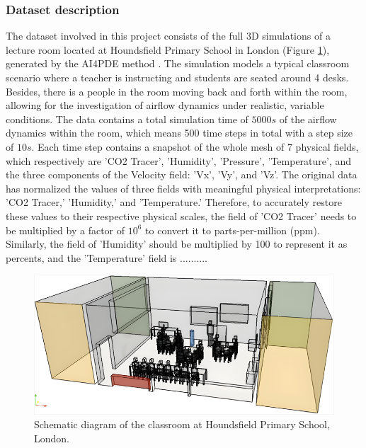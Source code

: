 \documentclass[final-report]{article-template}
\begin{document}
\subsubsection{Dataset description}
The dataset involved in this project consists of the full 3D simulations of a lecture room located at Houndsfield Primary School in London (Figure \ref{fig:classroom_schema}), generated by the AI4PDE method \cite{chen2024using}. The simulation models a typical classroom scenario where a teacher is instructing and students are seated around 4 desks. Besides, there is a people in the room moving back and forth within the room, allowing for the investigation of airflow dynamics under realistic, variable conditions. The data contains a total simulation time of $5000s$ of the airflow dynamics within the room, which means 500 time steps in total with a step size of $10s$. Each time step contains a snapshot of the whole mesh of 7 physical fields, which respectively are 'CO2 Tracer', 'Humidity', 'Pressure', 'Temperature', and the three components of the Velocity field: 'Vx', 'Vy', and 'Vz'. The original data has normalized the values of three fields with meaningful physical interpretations: 'CO2 Tracer,' 'Humidity,' and 'Temperature.' Therefore, to accurately restore these values to their respective physical scales, the field of 'CO2 Tracer' needs to be multiplied by a factor of $10^6$ to convert it to parts-per-million (ppm). Similarly, the field of 'Humidity' should be multiplied by 100 to represent it as percents, and the 'Temperature' field is .......... \\

\begin{figure}[htbp]
    \centering
    \includegraphics[width=13cm, trim=0.05cm 0.05cm 0.05cm 0.05cm, clip]{figures/classroom_schema.png}
    \caption{Schematic diagram of the classroom at Houndsfield Primary School, London.}
    \label{fig:classroom_schema}
\end{figure}
\end{document}
